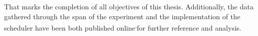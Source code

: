 That marks the completion of all objectives of this thesis.
Additionally, the data gathered through the span of the experiment and the implementation of the scheduler have been both published online\footnotemark[1]\textsuperscript{,}\footnotemark[2] for further reference and analysis.


\cleardoublepage









